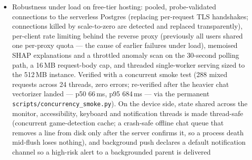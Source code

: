 \documentclass[11pt,a4paper]{article}
\begin{document}
\begin{itemize}[leftmargin=1.4em]
        scripted scan to have been the only such endpoint
        (\texttt{docs/API\_FUZZ\_REPORT.md}). The same pass retired six dependency
        CVEs (\texttt{pip-audit}), added Python static security analysis to match the
        apps' MobSF scan (\texttt{bandit}~\cite{bandit}: 44 medium findings, \emph{43 verified false
        positives} --- a script proved every flagged SQL string interpolates only a
        dialect placeholder or a hardcoded identifier, never user input --- and one
        real \texttt{eval} in test code, replaced with \texttt{ast.literal\_eval}), and
        confirmed by a committed-secret scan (\texttt{detect-secrets}~\cite{detectsecrets}) that no service-account
        key, signing keystore or server secret is tracked in this \emph{public}
        repository or ever was. Statement coverage of the suite is $75\%$ overall
        ($80\%$ excluding developer-only utility scripts). Both apps pass
        Android Lint with zero errors, and 110 JVM unit tests (run in CI) pin offline
        session/capture-health transitions, profile and risk-presentation rules, the
        offline chat queue's delivery semantics, the WAV container encoding, IME
        keystroke-to-sentence reconstruction, and parent-alert triage.
  \item Robustness under load on free-tier hosting: pooled, probe-validated connections
        to the serverless Postgres (replacing per-request TLS handshakes; connections
        killed by scale-to-zero are detected and replaced transparently), per-client
        rate limiting behind the reverse proxy (previously all users shared one
        per-proxy quota --- the cause of earlier failures under load), memoised SHAP
        explanations and a throttled anomaly scan on the 30-second polling path, a
        16\,MB request-body cap, and threaded single-worker serving sized to the
        512\,MB instance. Verified with a concurrent smoke test (288 mixed requests
        across 24 threads, zero errors; re-verified after the heavier chat vectorizer
        landed --- p50 66\,ms, p95 684\,ms --- via the permanent
        \texttt{scripts/concurrency\_smoke.py}). On the device side, state shared across the
        monitor, accessibility, keyboard and notification threads is made thread-safe
        (concurrent game-detection cache; a crash-safe offline chat queue that removes a
        line from disk only after the server confirms it, so a process death mid-flush
        loses nothing), and background push declares a default
        notification channel so a high-risk alert to a backgrounded parent is delivered

\end{itemize}
\end{document}
